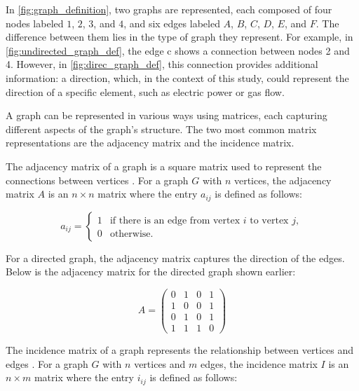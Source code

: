 In \cref{fig:graph_definition}, two graphs are represented, each composed of four nodes labeled $1$, $2$, $3$, and $4$, and six edges labeled $A$, $B$, $C$, $D$, $E$, and $F$. The difference between them lies in the type of graph they represent. For example, in \cref{fig:undirected_graph_def}, the edge c shows a connection between nodes 2 and 4. However, in \cref{fig:direc_graph_def}, this connection provides additional information: a direction, which, in the context of this study, could represent the direction of a specific element, such as electric power or gas flow.


A graph can be represented in various ways using matrices, each capturing different aspects of the graph's structure. The two most common matrix representations are the adjacency matrix and the incidence matrix.

The adjacency matrix of a graph is a square matrix used to represent the connections between vertices \cite{wilson_1972}. For a graph $G$ with $n$ vertices, the adjacency matrix $A$ is an $n \times n$ matrix where the entry $a_{ij}$ is defined as follows:

\begin{equation}
 a_{ij} = 
\begin{cases}
1 & \text{if there is an edge from vertex } i \text{ to vertex } j, \\
0 & \text{otherwise}.
\end{cases}
    \label{eq:adjacency_matrix_definition}
\end{equation}


For a directed graph, the adjacency matrix captures the direction of the edges. Below is the adjacency matrix for the directed graph shown earlier:

\[
A = \begin{pmatrix}
0 & 1 & 0 & 1 \\
1 & 0 & 0 & 1 \\
0 & 1 & 0 & 1 \\
1 & 1 & 1 & 0
\end{pmatrix}
\]


The incidence matrix of a graph represents the relationship between vertices and edges \cite{wilson_1972}. For a graph $G$ with $n$ vertices and $m$ edges, the incidence matrix $I$ is an $n \times m$ matrix where the entry $i_{ij}$ is defined as follows:

